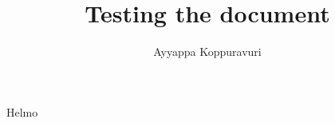 \documentclass{article}
\title{Testing the document}
\author{Ayyappa Koppuravuri}
\begin{document}
\maketitle
Helmo
\end{document}
